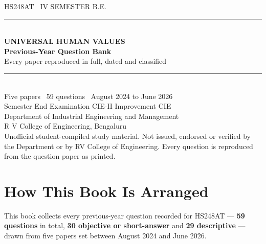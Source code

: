 \documentclass[11pt,a4paper,oneside]{book}
\begin{document}
\frontmatter
\pagestyle{empty}

\begin{center}
\vspace*{32mm}
{\sffamily\color{ocre}\large HS248AT \textbullet\ IV SEMESTER B.E.}\\[3mm]
{\color{rulegrey}\rule{0.55\textwidth}{1pt}}\\[9mm]
{\sffamily\bfseries\color{slate}\Huge UNIVERSAL HUMAN VALUES}\\[7mm]
{\sffamily\bfseries\color{slate}\LARGE Previous-Year Question Bank}\\[3mm]
{\sffamily\color{slatelight}\Large Every paper reproduced in full, dated and
 classified}\\[12mm]
{\color{rulegrey}\rule{0.55\textwidth}{1pt}}\\[9mm]
{\sffamily\color{slate}\large Five papers \textbullet\ 59 questions
 \textbullet\ August 2024 to June 2026}\\[3mm]
{\sffamily\color{slatelight}\large Semester End Examination \quad\textbullet\quad
 CIE-II \quad\textbullet\quad Improvement CIE}\\[16mm]
{\sffamily\color{slatelight} Department of Industrial Engineering and
 Management}\\[1mm]
{\sffamily\color{slatelight} R V College of Engineering, Bengaluru}\\
\vfill
{\footnotesize\sffamily\color{slatelight}
 Unofficial student-compiled study material. Not issued, endorsed or verified
 by the Department or by RV College of Engineering. Every question is
 reproduced from the question paper as printed.}
\vspace*{12mm}
\end{center}
\clearpage

\chapter*{How This Book Is Arranged}
\thispagestyle{plain}

This book collects every previous-year question recorded for HS248AT ---
\textbf{59 questions} in total, \textbf{30 objective or short-answer} and
\textbf{29 descriptive} --- drawn from five papers set between August 2024 and
June 2026.
\end{document}
